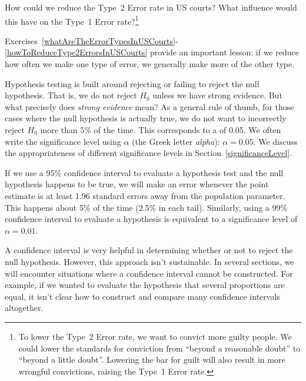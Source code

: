 \begin{exercise} \label{howToReduceType2ErrorsInUSCourts}
How could we reduce the Type~2 Error rate in US courts?
What influence would this have on the Type~1 Error
rate?\footnote{To lower the Type~2 Error rate, we want
  to convict more guilty people. We could lower the
  standards for conviction from ``beyond a reasonable
  doubt'' to ``beyond a little doubt''. Lowering the bar
  for guilt will also result in more wrongful convictions,
  raising the Type~1 Error rate.}
\end{exercise}


Exercises~\ref{whatAreTheErrorTypesInUSCourts}-\ref{howToReduceType2ErrorsInUSCourts} provide
an important lesson: if we reduce how often we make
 one type of error, we generally make more of the
 other type.

Hypothesis testing is built around rejecting or failing
to reject the null hypothesis.
That is, we do not reject $H_0$ unless we have strong evidence.
But what precisely does \emph{strong evidence} mean?
As a general rule of thumb, for those cases where the null
hypothesis is actually true, we do not want to incorrectly
reject $H_0$ more than 5\% of the time.
This corresponds to a
of 0.05.
We often write the significance level using $\alpha$
(the Greek letter \emph{alpha}):
$\alpha = 0.05$.
We discuss the appropriateness of different significance
levels in Section~\ref{significanceLevel}.

If we use a 95\% confidence interval to evaluate a
hypothesis test and the null hypothesis happens to be true,
we will make an error whenever the point estimate is
at least 1.96 standard errors away from the population
parameter.
This happens about 5\% of the time (2.5\% in each tail).
Similarly, using a 99\% confidence interval to evaluate
a hypothesis is equivalent to a significance level of
$\alpha = 0.01$.

A confidence interval is very helpful in determining
whether or not to reject the null hypothesis.
However, this approach isn't sustainable.
In several sections, we will encounter situations where
a confidence interval cannot be constructed.
For example, if we wanted to evaluate the hypothesis
that several proportions are equal, it isn't clear how
to construct and compare many confidence intervals
altogether.

